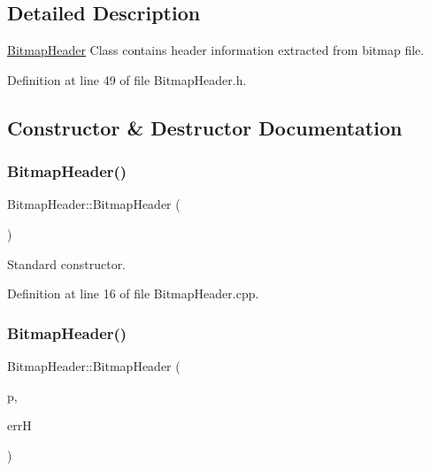 \subsection{Detailed Description}
\mbox{\hyperlink{classBitmapHeader}{Bitmap\+Header}} Class contains header information extracted from bitmap file. 

Definition at line 49 of file Bitmap\+Header.\+h.



\subsection{Constructor \& Destructor Documentation}
\mbox{\label{classBitmapHeader_a216e4a8485db7865be70c996f37e4c7d}} 
\subsubsection{\texorpdfstring{BitmapHeader()}{BitmapHeader()}\hspace{0.1cm}{\footnotesize\ttfamily [1/4]}}
{\footnotesize\ttfamily Bitmap\+Header\+::\+Bitmap\+Header (\begin{DoxyParamCaption}{ }\end{DoxyParamCaption})}



Standard constructor. 



Definition at line 16 of file Bitmap\+Header.\+cpp.

\mbox{\label{classBitmapHeader_a2cf57f049eae7d2ee93d5749d678aca5}} 
\subsubsection{\texorpdfstring{BitmapHeader()}{BitmapHeader()}\hspace{0.1cm}{\footnotesize\ttfamily [2/4]}}
{\footnotesize\ttfamily Bitmap\+Header\+::\+Bitmap\+Header (\begin{DoxyParamCaption}\item[{std\+::string}]{p,  }\item[{\mbox{\hyperlink{classErrorHandler}{Error\+Handler}} $\ast$}]{errH }\end{DoxyParamCaption})}



